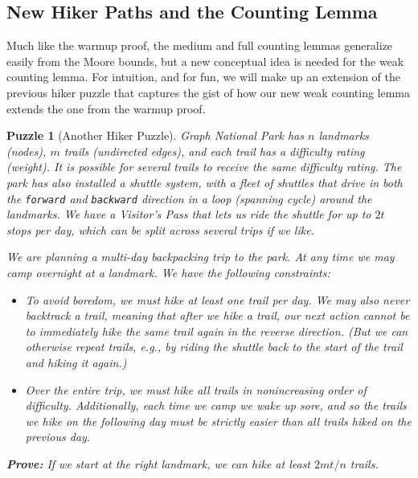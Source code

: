 \documentclass{article}\usepackage[a4paper,margin=20mm]{geometry}
\newcommand{\forward}{\texttt{forward}}
\newcommand{\backward}{\texttt{backward}}
\newtheorem{puzzle}[theorem]{Puzzle}
\begin{document}
\subsection{New Hiker Paths and the Counting Lemma}

Much like the warmup proof, the medium and full counting lemmas generalize easily from the Moore bounds, but a new conceptual idea is needed for the weak counting lemma.
For intuition, and for fun, we will make up an extension of the previous hiker puzzle that captures the gist of how our new weak counting lemma extends the one from the warmup proof.

\begin{puzzle}[Another Hiker Puzzle]\label{puzzle:another}
Graph National Park has $n$ landmarks (nodes), $m$ trails (undirected edges), and each trail has a difficulty rating (weight).
It is possible for several trails to receive the same difficulty rating.
The park has also installed a shuttle system, with a fleet of shuttles that drive in both the \forward{} and \backward{} direction in a loop (spanning cycle) around the landmarks.
We have a Visitor's Pass that lets us ride the shuttle for up to $2t$ stops per day, which can be split across several trips if we like.

We are planning a multi-day backpacking trip to the park.
At any time we may camp overnight at a landmark.
We have the following constraints:
\begin{itemize}
\item To avoid boredom, we must hike at least one trail per day.
We may also never \emph{backtrack} a trail, meaning that after we hike a trail, our next action cannot be to immediately hike the same trail again in the reverse direction.
(But we can otherwise repeat trails, e.g., by riding the shuttle back to the start of the trail and hiking it again.)


\item Over the entire trip, we must hike all trails in nonincreasing order of difficulty.
Additionally, each time we camp we wake up sore, and so the trails we hike on the following day must be \emph{strictly} easier than all trails hiked on the previous day.
\end{itemize}


\noindent \textbf{Prove:} If we start at the right landmark, we can hike at least $2mt/n$ trails.

\begin{center}
\begin{tikzpicture}


\end{tikzpicture}
\end{center}
\end{puzzle}
\end{document}
